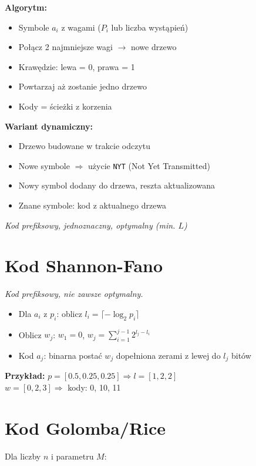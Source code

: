 \documentclass{../konspekt}
\begin{document}
\begin{multicols}{2}
\begin{multicols}{2}
    \textbf{Algorytm:}
    \begin{itemize}
        \setlength{\itemsep}{1pt}
      \item Symbole $a_i$ z wagami ($P_i$ lub liczba wystąpień)
      \item Połącz 2 najmniejsze wagi $\rightarrow$ nowe drzewo
      \item Krawędzie: lewa = 0, prawa = 1
      \item Powtarzaj aż zostanie jedno drzewo
      \item Kody = ścieżki z korzenia
    \end{itemize}

    \columnbreak

    \textbf{Wariant dynamiczny:}
    \begin{itemize}
        \setlength{\itemsep}{1pt}
      \item Drzewo budowane w trakcie odczytu
      \item Nowe symbole $\Rightarrow$ użycie \texttt{NYT} (Not Yet Transmitted)
      \item Nowy symbol dodany do drzewa, reszta aktualizowana
      \item Znane symbole: kod z aktualnego drzewa
    \end{itemize}
    \textit{Kod prefiksowy, jednoznaczny, optymalny (min. $L$)}

  \end{multicols}

  \vspace{-2em}
  \section*{Kod Shannon-Fano}

  \textit{Kod prefiksowy, nie zawsze optymalny.}
  \begin{itemize}
    \item Dla $a_i$ z $p_i$: oblicz $l_i = \lceil -\log_2 p_i \rceil$
    \item Oblicz $w_j$: \quad $w_1 = 0$, \quad $w_j =
      \sum_{i=1}^{j-1} 2^{l_j - l_i}$
    \item Kod $a_j$: binarna postać $w_j$ dopełniona zerami z lewej
      do $l_j$ bitów
  \end{itemize}
  \textbf{Przykład:} $p = [0.5, 0.25, 0.25] \Rightarrow l = [1, 2, 2]$ \\
  $w = [0, 2, 3] \Rightarrow$ \quad kody: 0, 10, 11

  \section*{Kod Golomba/Rice}
  Dla liczby $n$ i parametru $M$:


\end{multicols}
\end{document}
